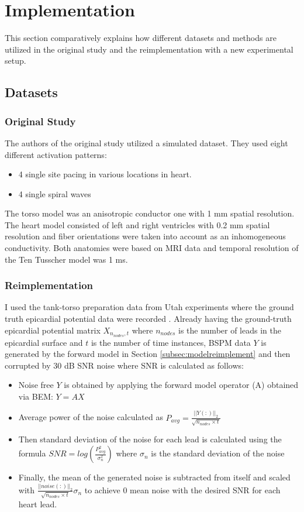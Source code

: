 \documentclass[draftcls, onecolumn, journal]{IEEEtran}
\begin{document}
\section{Implementation}\label{sec:implementation}

This section comparatively explains how different datasets and methods are utilized in the original study and the reimplementation with a new experimental setup. 

\subsection{Datasets}

\subsubsection{Original Study}

The authors of the original study utilized a simulated dataset. They used eight different activation patterns:
\begin{itemize}
    \item 4 single site pacing in various locations in heart.
    \item 4 single spiral waves
\end{itemize}
The torso model was an anisotropic conductor one with 1 mm spatial resolution. The heart model consisted of left and right ventricles with 0.2 mm spatial resolution and fiber orientations were taken into account as an inhomogeneous conductivity. Both anatomies were based on MRI data and temporal resolution of the Ten Tusscher \cite*{ten2004model} model was 1 ms.

\subsubsection{Reimplementation}

I used the tank-torso preparation data from Utah experiments where the ground truth epicardial potential data were recorded \cite*{macleod1995electrocardiographic}. Already having the ground-truth epicardial potential matrix $X_{n_{nodes},t}$ where $n_{nodes}$ is the number of leads in the epicardial surface and $t$ is the number of time instances, BSPM data $Y$ is generated by the forward model in Section \ref{subsec:modelreimplement} and then corrupted by 30 dB SNR noise where SNR is calculated as follows:
\begin{itemize}
    \item Noise free $Y$ is obtained by applying the forward model operator (A) obtained via BEM: $Y = AX$
    \item Average power of the noise calculated as $P_{avg} = \frac{||Y(:)||_2}{\sqrt{n_{nodes} \times t}}$
    \item Then standard deviation of the noise for each lead is calculated using the formula $SNR = log(\frac{P_{avg}^2}{\sigma_n^2})$ where $\sigma_n$ is the standard deviation of the noise
    \item Finally, the mean of the generated noise is subtracted from itself and scaled with $\frac{||noise(:)||_2}{\sqrt{n_{nodes} \times t}}\sigma_n$ to achieve 0 mean noise with the desired SNR for each heart lead. 
\end{itemize}
\end{document}
